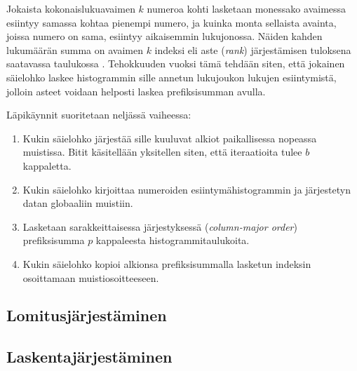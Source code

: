 \documentclass[a4paper,11pt]{article}
\newcommand{\engl}[1]{\foreignlanguage{english}{\em #1}}
\begin{document}
Jokaista kokonaislukuavaimen $k$ numeroa kohti lasketaan monessako avaimessa esiintyy samassa kohtaa pienempi numero, ja kuinka monta sellaista avainta, joissa numero on sama, esiintyy aikaisemmin lukujonossa. Näiden kahden lukumäärän summa on avaimen $k$ indeksi eli aste (\engl{rank}) järjestämisen tuloksena saatavassa taulukossa \cite{satish2009}. Tehokkuuden vuoksi tämä tehdään siten, että jokainen säielohko laskee histogrammin sille annetun lukujoukon lukujen esiintymistä, jolloin asteet voidaan helposti laskea prefiksisumman avulla.

Läpikäynnit suoritetaan neljässä vaiheessa:
\singlespacing
\begin{enumerate}
\item Kukin säielohko järjestää sille kuuluvat alkiot paikallisessa nopeassa muistissa. Bitit käsitellään yksitellen siten, että iteraatioita tulee $b$ kappaletta.
\item Kukin säielohko kirjoittaa numeroiden esiintymähistogrammin ja järjestetyn datan globaaliin muistiin.
\item Lasketaan sarakkeittaisessa järjestyksessä (\engl{column-major order}) prefiksisumma $p$ kappaleesta histogrammitaulukoita.
\item Kukin säielohko kopioi alkionsa prefiksisummalla lasketun indeksin osoittamaan muistiosoitteeseen.
\end{enumerate}
\onehalfspacing



\subsection{Lomitusjärjestäminen}


\subsection{Laskentajärjestäminen}




\printbibliography
\end{document}
